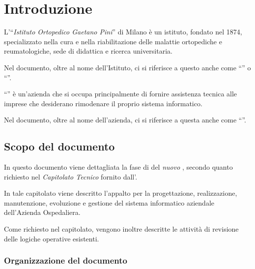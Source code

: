 \chapter{Introduzione}\label{ch:introduzione}
	
	L'``\textit{Istituto Ortopedico Gaetano Pini}''\cite{istituto} di Milano è un istituto, fondato nel 1874, specializzato nella cura e nella riabilitazione delle malattie ortopediche e reumatologiche, sede di didattica e ricerca universitaria.

	Nel documento, oltre al nome dell'Istituto, ci si riferisce a questo anche come ``\textit{\istituto}'' o  ``\textit{\proponente}''.
	
	``\textit{\azienda}''\cite{sito_azienda} è un'azienda che si occupa principalmente di fornire assistenza tecnica alle imprese che desiderano rimodenare il proprio sistema informatico.

	Nel documento, oltre al nome dell'azienda, ci si riferisce a questa anche come ``\textit{\offerente}''.

\section{Scopo del documento}\label{sec:scopo_documento}
	
	In questo documento viene dettagliata la fase di \textit{\rollout} del \textit{nuovo \helpdesk}, secondo quanto richiesto nel \textit{Capitolato Tecnico} fornito dall'\istituto.
	
	In tale capitolato viene descritto l'appalto per la progettazione, realizzazione, manutenzione, evoluzione e gestione del sistema informatico aziendale dell'Azienda Ospedaliera.
	
	Come richiesto nel capitolato, vengono inoltre descritte le attività di revisione delle logiche operative esistenti.
	
	\subsection{Organizzazione del documento}\label{sec:organizzazione_documento}
	
